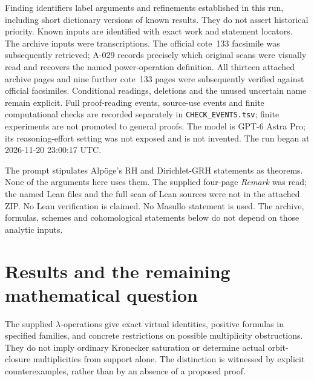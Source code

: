 \documentclass[11pt]{article}
\begin{document}
Finding identifiers label arguments and refinements established in this
run, including short dictionary versions of known results. They do not
assert historical priority. Known inputs are identified with exact work
and statement locators. The archive inputs were transcriptions. The official cote~133 facsimile
was subsequently retrieved; A-029 records precisely which original
scans were visually read and recovers the named power-operation definition.
All thirteen attached archive pages and nine further cote~133 pages
were subsequently verified against official facsimiles. Conditional
readings, deletions and the unused uncertain name remain explicit. Full proof-reading events, source-use events
and finite computational checks are recorded separately in
\texttt{CHECK\_EVENTS.tsv}; finite experiments are not promoted to general
proofs. The model is GPT-6 Astra Pro; its reasoning-effort setting was not
exposed and is not invented. The run began at 2026-11-20 23:00:17 UTC.

The prompt stipulates Alp\"oge's RH and Dirichlet-GRH statements as
theorems. None of the arguments here uses them. The supplied four-page
\emph{Remark} was read; the named Lean files and the full scan of Lean
sources were not in the attached ZIP. No Lean verification is claimed.
No Masullo statement is used. The archive, formulas, schemes and
cohomological statements below do not depend on those analytic inputs.
\clearpage
\tableofcontents
\clearpage
\section*{Results and the remaining mathematical question}

The supplied \(\lambda\)-operations give exact virtual identities,
positive formulas in specified families, and concrete restrictions on
possible multiplicity obstructions. They do not imply ordinary
Kronecker saturation or determine actual orbit-closure multiplicities
from support alone. The distinction is witnessed by explicit
counterexamples, rather than by an absence of a proposed proof.
\end{document}
